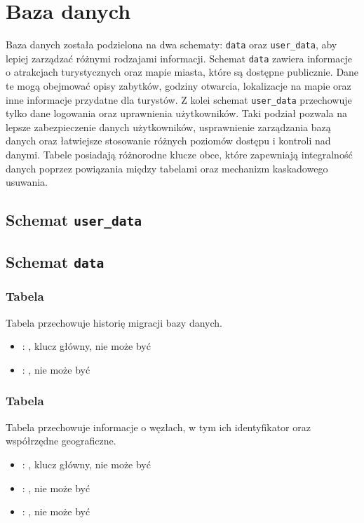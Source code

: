 \section{Baza danych}
Baza danych została podzielona na dwa schematy: \texttt{data} oraz \texttt{user\_data}, aby lepiej zarządzać różnymi rodzajami informacji.
Schemat \texttt{data} zawiera informacje o atrakcjach turystycznych oraz mapie miasta, które są dostępne publicznie.
Dane te mogą obejmować opisy zabytków, godziny otwarcia, lokalizacje na mapie oraz inne informacje przydatne dla turystów.
Z kolei schemat \texttt{user\_data} przechowuje tylko dane logowania oraz uprawnienia użytkowników.
Taki podział pozwala na lepsze zabezpieczenie danych użytkowników, usprawnienie zarządzania bazą danych oraz łatwiejsze stosowanie różnych poziomów dostępu i kontroli nad danymi.
Tabele posiadają różnorodne klucze obce, które zapewniają integralność danych poprzez powiązania między tabelami oraz mechanizm kaskadowego usuwania.

\subsection{Schemat \texttt{user\_data}}

\subsection{Schemat \texttt{data}}

\subsubsection{Tabela }
Tabela przechowuje historię migracji bazy danych.
\begin{itemize}
    \item {}: , klucz główny, nie może być 
    \item {}: , nie może być 
\end{itemize}

\subsubsection{Tabela }
Tabela przechowuje informacje o węzłach, w tym ich identyfikator oraz współrzędne geograficzne.
\begin{itemize}
    \item {}: , klucz główny, nie może być 
    \item {}: , nie może być 
    \item {}: , nie może być 
\end{itemize}

